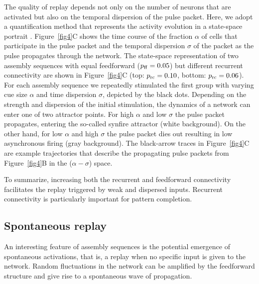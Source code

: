     The quality of replay depends not only on the number of neurons that are
    activated but also on the temporal dispersion of the pulse packet. Here,
    we adopt a quantification method that represents the activity evolution in
    a state-space portrait \citep{Diesmann1999}.  Figure~\ref{fig4}C shows the
    time course of the fraction $\alpha$ of cells that participate in the pulse
    packet and the temporal dispersion $\sigma$ of the packet as the pulse
    propagates through the network.  The state-space representation of two
    assembly sequences with equal feedforward ($p_{\rm ff}=0.05$) but different
    recurrent connectivity are shown in Figure~\ref{fig4}C (top: $p_{\rm
    rc}=0.10$, bottom: $p_{\rm rc}=0.06$).  For each assembly sequence we
    repeatedly stimulated the first group with varying cue size $\alpha$ and
    time dispersion $\sigma$, depicted by the black dots.  Depending on the
    strength and dispersion of the initial stimulation, the dynamics of a
    network can enter one of two attractor points. For high $\alpha$ and low
    $\sigma$ the pulse packet propagates, entering the so-called synfire
    attractor (white background).  On the other hand, for low $\alpha$ and high
    $\sigma$ the pulse packet dies out resulting in low asynchronous firing
    (gray background).  The black-arrow traces in Figure~\ref{fig4}C are
    example trajectories that describe the propagating pulse packets from
    Figure~\ref{fig4}B in the ($\alpha-\sigma$) space.

    To summarize, increasing both the recurrent and feedforward connectivity
    facilitates the replay triggered by weak and dispersed inputs. Recurrent
    connectivity is particularly important for pattern completion.

  \subsection{Spontaneous replay}
    An interesting feature of assembly sequences is the potential emergence of
    spontaneous activations, that is, a replay when no specific input is given
    to the network.  Random fluctuations in the network can be amplified by
    the feedforward structure and give rise to a spontaneous wave of
    propagation.

